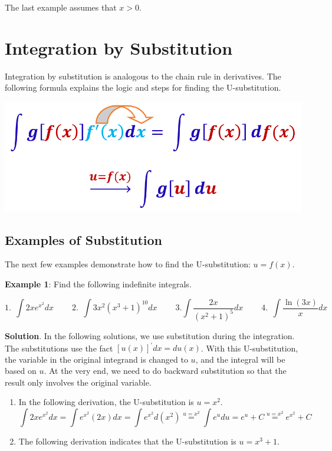 \documentclass[
]{book}
\begin{document}
The last example assumes that \(x > 0\).

\hfill\break

\hypertarget{integration-by-substitution}{%
\section{Integration by Substitution}\label{integration-by-substitution}}

Integration by substitution is analogous to the chain rule in derivatives. The following formula explains the logic and steps for finding the U-substitution.

\begin{center}\includegraphics[width=0.65\linewidth]{img13/w13-integrationSubstitution} \end{center}

\hypertarget{examples-of-substitution}{%
\subsection{Examples of Substitution}\label{examples-of-substitution}}

The next few examples demonstrate how to find the U-substitution: \(u = f(x)\).

\textbf{Example 1}: Find the following indefinite integrals.

\[
\text{1.}~~ \int2xe^{x^2}dx~~~~~~~~~~\text{2.}~~ \int3x^2(x^3+1)^{10}dx ~~~~~~~~~~\text{3.} \int\frac{2x}{(x^2+1)^5}dx~~~~~~~~~~\text{4.}~~ \int\frac{\ln(3x)}{x}dx
\]

\textbf{Solution}. In the following solutions, we use substitution during the integration. The substitutions use the fact \([u(x)]^\prime dx = d u(x)\). With this U-substitution, the variable in the original integrand is changed to \(u\), and the integral will be based on \(u\). At the very end, we need to do backward substitution so that the result only involves the original variable.

\begin{enumerate}
\def\labelenumi{\arabic{enumi}.}
\item
  In the following derivation, the U-substitution is \(u = x^2\).
  \[
  \int2xe^{x^2}dx = \int e^{x^2} (2x)dx = \int e^{x^2}d(x^2) \stackrel{u = x^2}{=} \int e^udu = e^u+C \stackrel{u = x^2}{=}  e^{x^2} + C  
  \]
\item
  The following derivation indicates that the U-substitution is \(u = x^3 + 1\).
\end{enumerate}
\end{document}
